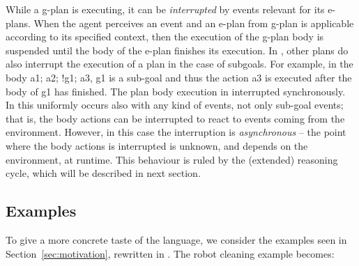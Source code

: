 %
%
%


While a g-plan is executing, it can be \emph{interrupted} by events
relevant for its e-plans. When the agent perceives an event and an
e-plan from g-plan is applicable according to its specified context,
then the execution of the g-plan body is suspended until the body of
the e-plan finishes its execution.
%
In {\asl}, other plans do also interrupt the execution of a plan in
the case of subgoals. For example, in the body \textsf{a1; a2; !g1;
  a3}, \textsf{g1} is a sub-goal and thus the action \textsf{a3} is
executed after the body of \textsf{g1} has finished. The plan body
execution in interrupted synchronously.
%
In {\aser} this uniformly occurs also with any kind of events, not
only sub-goal events; that is, the body actions can be interrupted to
react to events coming from the environment. However, in this case the
interruption is \emph{asynchronous} -- the point where the body
actions is interrupted is unknown, and depends on the environment, at
runtime.
%
This behaviour is ruled by the (extended) reasoning cycle, which will
be described in next section.


%
\subsection{Examples}
To give a more concrete taste of the language,  we consider the examples seen in Section~\ref{sec:motivation}, rewritten in {\aser}. 
%
The robot cleaning example becomes:

